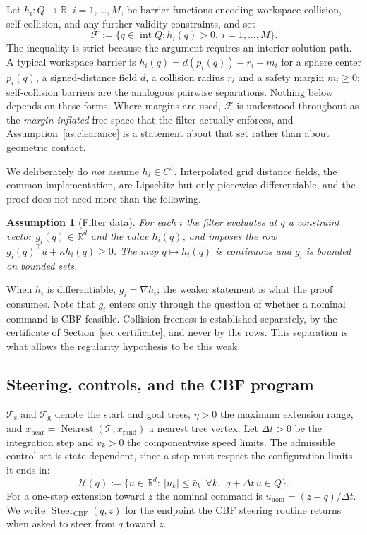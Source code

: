 \documentclass[11pt]{article}
\newtheorem{assumption}{Assumption}
\theoremstyle{remark}
\newcommand{\R}{\mathbb{R}}
\newcommand{\F}{\mathcal{F}}
\newcommand{\U}{\mathcal{U}}
\newcommand{\Ts}{\mathcal{T}_{\mathrm{s}}}
\newcommand{\Tg}{\mathcal{T}_{\mathrm{g}}}
\newcommand{\Steer}{\operatorname{Steer}_{\mathrm{CBF}}}
\newcommand{\Nearest}{\operatorname{Nearest}}
\newcommand{\interior}{\operatorname{int}}
\newcommand{\unom}{u_{\mathrm{nom}}}
\begin{document}
Let $h_i:Q\to\R$, $i=1,\dots,M$, be barrier functions encoding workspace collision,
self-collision, and any further validity constraints, and set
\begin{equation}
\F:=\{q\in\interior Q: h_i(q)>0,\ i=1,\dots,M\}.
\label{eq:free-space}
\end{equation}
The inequality is strict because the argument requires an interior solution path. A typical
workspace barrier is $h_i(q)=d(p_i(q))-r_i-m_i$ for a sphere center $p_i(q)$, a
signed-distance field $d$, a collision radius $r_i$ and a safety margin $m_i\ge 0$; self-collision
barriers are the analogous pairwise separations. Nothing below depends on these forms.
Where margins are used, $\F$ is understood throughout as the \emph{margin-inflated} free
space that the filter actually enforces, and Assumption~\ref{as:clearance} is a statement
about that set rather than about geometric contact.

We deliberately do \emph{not} assume $h_i\in C^1$. Interpolated grid distance fields, the
common implementation, are Lipschitz but only piecewise differentiable, and the proof does
not need more than the following.

\begin{assumption}[Filter data]
\label{as:filter-data}
For each $i$ the filter evaluates at $q$ a constraint vector $g_i(q)\in\R^d$ and the value
$h_i(q)$, and imposes the row $g_i(q)^\top u+\kappa h_i(q)\ge 0$. The map $q\mapsto h_i(q)$
is continuous and $g_i$ is bounded on bounded sets.
\end{assumption}

When $h_i$ is differentiable, $g_i=\nabla h_i$; the weaker statement is what the proof
consumes. Note that $g_i$ enters only through the question of whether a nominal command is
CBF-feasible. Collision-freeness is established separately, by the certificate of
Section~\ref{sec:certificate}, and never by the rows. This separation is what allows the
regularity hypothesis to be this weak.

\subsection{Steering, controls, and the CBF program}

$\Ts$ and $\Tg$ denote the start and goal trees, $\eta>0$ the maximum extension range, and
$x_{\mathrm{near}}=\Nearest(\mathcal T,x_{\mathrm{rand}})$ a nearest tree vertex. Let
$\Delta t>0$ be the integration step and $\bar v_k>0$ the componentwise speed limits. The
admissible control set is state dependent, since a step must respect the configuration
limits it ends in:
\begin{equation}
\U(q):=\bigl\{u\in\R^d:\ |u_k|\le\bar v_k\ \ \forall k,\ \ q+\Delta t\,u\in Q\bigr\}.
\label{eq:control-set}
\end{equation}
For a one-step extension toward $z$ the nominal command is $\unom=(z-q)/\Delta t$. We write
$\Steer(q,z)$ for the endpoint the CBF steering routine returns when asked to steer from
$q$ toward $z$.
\end{document}

